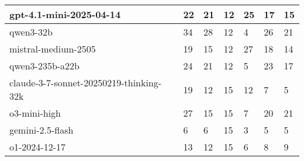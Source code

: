 \begin{tabular}{ l | I{2} I{2} I{2} I{2} I{2} I{2} }
  gpt-4.1-mini-2025-04-14                 & 22 & 21 & 12 & 25 & 17 & 15 \\ \hline
  qwen3-32b                               & 34 & 28 & 12 & 4  & 26 & 21 \\ \hline
  mistral-medium-2505                     & 19 & 15 & 12 & 27 & 18 & 14 \\ \hline
  qwen3-235b-a22b                         & 24 & 21 & 12 & 5  & 23 & 17 \\ \hline
  claude-3-7-sonnet-20250219-thinking-32k & 19 & 12 & 15 & 12 & 7  & 5  \\ \hline
  o3-mini-high                            & 27 & 15 & 15 & 7  & 20 & 21 \\ \hline
  gemini-2.5-flash                        & 6  & 6  & 15 & 3  & 5  & 5  \\ \hline
  o1-2024-12-17                           & 13 & 12 & 15 & 6  & 8  & 9
\end{tabular}
